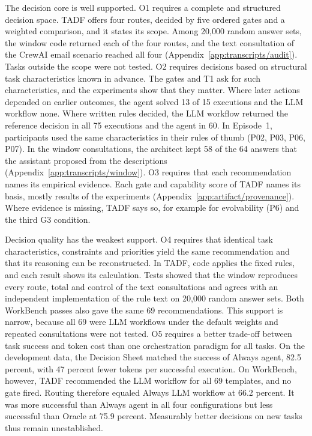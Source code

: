The decision core is well supported. O1 requires a complete and structured decision space. TADF offers four routes, decided by five ordered gates and a weighted comparison, and it states its scope. Among 20,000 random answer sets, the window code returned each of the four routes, and the text consultation of the CrewAI email scenario reached all four (Appendix~\ref{app:transcripts/audit}). Tasks outside the scope were not tested. O2 requires decisions based on structural task characteristics known in advance. The gates and T1 ask for such characteristics, and the experiments show that they matter. Where later actions depended on earlier outcomes, the agent solved 13 of 15 executions and the LLM workflow none. Where written rules decided, the LLM workflow returned the reference decision in all 75 executions and the agent in 60. In Episode~1, participants used the same characteristics in their rules of thumb (P02, P03, P06, P07). In the window consultations, the architect kept 58 of the 64 answers that the assistant proposed from the descriptions (Appendix~\ref{app:transcripts/window}). O3 requires that each recommendation names its empirical evidence. Each gate and capability score of TADF names its basis, mostly results of the experiments (Appendix~\ref{app:artifact/provenance}). Where evidence is missing, TADF says so, for example for evolvability (P6) and the third G3 condition.

Decision quality has the weakest support. O4 requires that identical task characteristics, constraints and priorities yield the same recommendation and that its reasoning can be reconstructed. In TADF, code applies the fixed rules, and each result shows its calculation. Tests showed that the window reproduces every route, total and control of the text consultations and agrees with an independent implementation of the rule text on 20,000 random answer sets. Both WorkBench passes also gave the same 69 recommendations. This support is narrow, because all 69 were LLM workflows under the default weights and repeated consultations were not tested. O5 requires a better trade-off between task success and token cost than one orchestration paradigm for all tasks. On the development data, the Decision Sheet matched the success of Always agent, 82.5 percent, with 47 percent fewer tokens per successful execution. On WorkBench, however, TADF recommended the LLM workflow for all 69 templates, and no gate fired. Routing therefore equaled Always LLM workflow at 66.2 percent. It was more successful than Always agent in all four configurations but less successful than Oracle at 75.9 percent. Measurably better decisions on new tasks thus remain unestablished.

